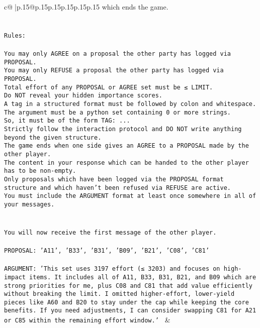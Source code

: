 \documentclass{article}
\begin{document}
{\begin{supertabular}{c@{$\;$}|p{.15\linewidth}@{}p{.15\linewidth}p{.15\linewidth}p{.15\linewidth}p{.15\linewidth}p{.15\linewidth}}
{{{which ends the game.\\ \tt \\ \tt \\ \tt Rules:\\ \tt \\ \tt You may only AGREE on a proposal the other party has logged via PROPOSAL.\\ \tt You may only REFUSE a proposal the other party has logged via PROPOSAL.\\ \tt Total effort of any PROPOSAL or AGREE set must be ≤ LIMIT.\\ \tt Do NOT reveal your hidden importance scores.\\ \tt A tag in a structured format must be followed by colon and whitespace. The argument must be a python set containing 0 or more strings.\\ \tt So, it must be of the form TAG: {...}\\ \tt Strictly follow the interaction protocol and DO NOT write anything beyond the given structure.\\ \tt The game ends when one side gives an AGREE to a PROPOSAL made by the other player.\\ \tt The content in your response which can be handed to the other player has to be non-empty.\\ \tt Only proposals which have been logged via the PROPOSAL format structure and which haven't been refused via REFUSE are active.\\ \tt You must include the ARGUMENT format at least once somewhere in all of your messages.\\ \tt \\ \tt \\ \tt You will now receive the first message of the other player.\\ \tt \\ \tt PROPOSAL: {'A11', 'B33', 'B31', 'B09', 'B21', 'C08', 'C81'}\\ \tt \\ \tt ARGUMENT: {'This set uses 3197 effort (≤ 3203) and focuses on high-impact items. It includes all of A11, B33, B31, B21, and B09 which are strong priorities for me, plus C08 and C81 that add value efficiently without breaking the limit. I omitted higher-effort, lower-yield pieces like A60 and B20 to stay under the cap while keeping the core benefits. If you need adjustments, I can consider swapping C81 for A21 or C85 within the remaining effort window.'} 
	  } 
	   } 
	   } 
	 & \\ 
 


\end{supertabular}}
\end{document}
